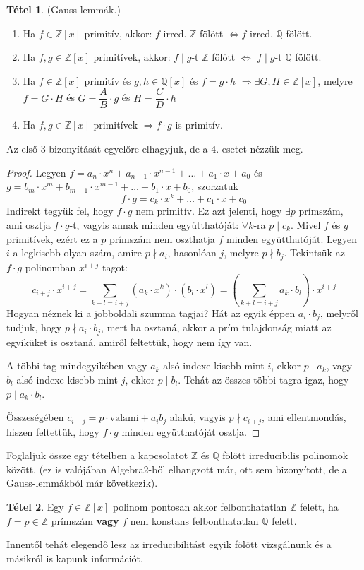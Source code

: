 \documentclass[12pt]{book}
\theoremstyle{plain} %
\theoremstyle{definition} %
\newtheorem{theo/}{Tétel}[section]
\newenvironment{theo}
  {\renewcommand{\qedsymbol}{$\clubsuit$}%
   \pushQED{\qed}\begin{theo/}}
  {\popQED\end{theo/}}
\theoremstyle{remark}
\renewcommand\qedsymbol{$\blacksquare$}
\numberwithin{equation}{section}  %
\begin{document}
	\begin{theo}\label{gl}
		(Gauss-lemmák.)
		\begin{enumerate}
			\item Ha $f\in \mathbb{Z}[x]$ primitív, akkor: $f$ irred. $\mathbb{Z}$ fölött $\Leftrightarrow f$ irred. $\mathbb{Q}$ fölött.
			\item Ha $f,g\in \mathbb{Z}[x]$ primitívek, akkor: $f\mid g$-t $\mathbb{Z}$ fölött $\Leftrightarrow$ $f\mid g$-t $\mathbb{Q}$ fölött.
			\item Ha $f\in \mathbb{Z}[x]$ primitív és $g,h\in \mathbb{Q}[x]$ és $f=g\cdot h$ $\Rightarrow \exists G,H\in \mathbb{Z}[x]$, melyre $f=G\cdot H$ és $G=\dfrac{A}{B}\cdot g$ és $H=\dfrac{C}{D}\cdot h$
			\item Ha $f,g \in \mathbb{Z}[x]$ primitívek $\Rightarrow f\cdot g$ is primitív.
		\end{enumerate}
	\end{theo}
	Az első 3 bizonyítását egyelőre elhagyjuk, de a 4. esetet nézzük meg.
	\begin{proof}
		Legyen $f=a_n\cdot x^n + a_{n-1}\cdot x^{n-1} + \ldots + a_1\cdot x + a_0$ és $g=b_m\cdot x^m + b_{m-1}\cdot x^{m-1} + \ldots + b_1\cdot x + b_0$, szorzatuk
		\[ f\cdot g = c_k\cdot x^k + \ldots + c_1 \cdot x + c_0  \]
		Indirekt tegyük fel, hogy $f\cdot g$ nem primitív. Ez azt jelenti, hogy $\exists p$ prímszám, ami osztja $f\cdot g$-t, vagyis annak minden együtthatóját: $\forall k$-ra $p \mid c_k$. Mivel $f$ és $g$ primitívek, ezért ez a $p$ prímszám nem oszthatja $f$ minden együtthatóját. Legyen $i$ a legkisebb olyan szám, amire $p \nmid a_i$, hasonlóan $j$, melyre $p \nmid b_j$.
		Tekintsük az $f\cdot g$ polinomban $x^{i+j}$ tagot:
		\[ c_{i+j} \cdot x^{i+j}= \displaystyle\sum_{k+l=i+j} {(a_k\cdot x^k)\cdot (b_l\cdot x^l)} = \left( \displaystyle\sum_{k+l=i+j} a_k \cdot b_l \right) \cdot x^{i+j} \]
		Hogyan néznek ki a jobboldali szumma tagjai? Hát az egyik éppen $a_i\cdot b_j$, melyről tudjuk, hogy $p \nmid a_i\cdot b_j$, mert ha osztaná, akkor a prím tulajdonság miatt az egyiküket is osztaná, amiről feltettük, hogy nem így van.
		
		A többi tag mindegyikében vagy $a_k$ alsó indexe kisebb mint $i$, ekkor $p\mid a_k$, vagy $b_l$ alsó indexe kisebb mint $j$, ekkor $p\mid b_l$. Tehát az összes többi tagra igaz, hogy $p\mid a_k\cdot b_l$.
		
		Összeségében $c_{i+j} = p\cdot \text{valami} + a_i b_j$ alakú, vagyis $p \nmid c_{i+j}$, ami ellentmondás, hiszen feltettük, hogy $f\cdot g$ minden együtthatóját osztja.
	\end{proof}
	Foglaljuk össze egy tételben a kapcsolatot $\mathbb{Z}$ és $\mathbb{Q}$ fölött irreducibilis polinomok között. (ez is valójában Algebra2-ből elhangzott már, ott sem bizonyított, de a Gauss-lemmákból már következik).
	\begin{theo}
		Egy $f\in \mathbb{Z}[x]$ polinom pontosan akkor felbonthatatlan $\mathbb{Z}$ felett, ha $f=p\in \mathbb{Z}$ prímszám \textbf{vagy} $f$ nem konstans felbonthatatlan $\mathbb{Q}$ felett.
	\end{theo}
	Innentől tehát elegendő lesz az irreducibilitást egyik fölött vizsgálnunk és a másikról is kapunk információt.
	
\end{document}
